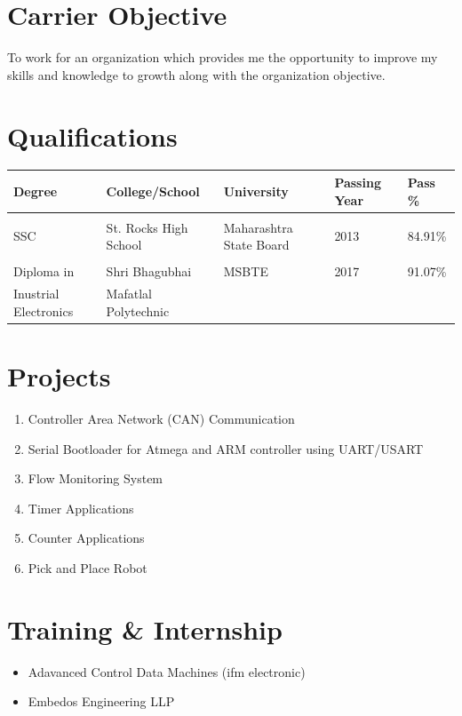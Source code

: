 \documentclass{article}
\begin{document}
\section{Carrier Objective}
To work for an organization which provides me the opportunity to improve my skills and knowledge to growth along with the organization objective.
		
\section{Qualifications}
	\begin{center}
		\begin{tabular}{l l l l l }
			Degree & College/School & University & Passing Year & Pass \% \\ \hline \\
			SSC & St. Rocks High School & Maharashtra State Board & 2013 & 84.91\% \\ \\
			Diploma in  & Shri Bhagubhai & MSBTE & 2017 & 91.07\% \\ 
			Inustrial Electronics & Mafatlal Polytechnic
		\end{tabular}
	\end{center}

\section{Projects}
	\begin{enumerate}
		\item Controller Area Network (CAN) Communication
		\item Serial Bootloader for Atmega and ARM controller using UART/USART
		\item Flow Monitoring System
		\item Timer Applications
		\item Counter Applications
		\item Pick and Place Robot
	\end{enumerate}

\section{Training \& Internship}
	\begin{itemize}
		\item Adavanced Control Data Machines (ifm electronic)
		\item Embedos Engineering LLP
	\end{itemize}
\end{document}
